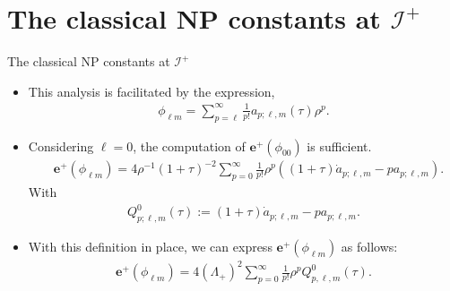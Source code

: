 \documentclass{beamer}
\theoremstyle{remark}
\theoremstyle{plain}
\theoremstyle{plain}
\begin{document}
\section{The classical NP constants at $\mathscr{I}^{+}$}
\begin{frame}{The classical NP constants at $\mathscr{I}^{+}$}
  \begin{itemize}
    \item This analysis is facilitated by the expression,
    \begin{align}\label{eq:exp_phi_lm}
      \phi_{\ell m}= \sum_{p=\ell}^{\infty}\frac{1}{p!}a_{p;\ell,m}(\tau)\rho^{p}.
    \end{align}
    \item Considering $\ell=0$, the computation of $\boldsymbol{e}^{+}(\phi_{00})$ is sufficient.
    \begin{align}\label{eq:bmeplus1philmraw}
      & \boldsymbol{e}^{+}(\phi_{\ell m}) = 4 \rho^{-1}(1+\tau)^{-2}\sum_{p=0}^{\infty} \frac{1}{p!}\rho^p((1+\tau)\dot{a}_{p;\ell,m}-p a_{p;\ell,m}).
    \end{align}
    With
    \begin{align}\label{eq:defQ0}
      Q^{0}_{p;\ell,m}(\tau):=(1+\tau)\dot{a}_{p;\ell,m}-p a_{p;\ell,m}.
    \end{align}
    \item With this definition in place, we can express $\boldsymbol{e}^{+}(\phi_{\ell m})$ as follows:
    \begin{align}\label{eq:bmeplus1philm}
      \boldsymbol{e}^{+}(\phi_{\ell m}) = 4 (\Lambda_{+})^{2}\sum_{p=0}^{\infty} \frac{1}{p!}\rho^{p}Q^{0}_{p,\ell,m}(\tau).
    \end{align}
  \end{itemize}
\end{frame}
\end{document}
